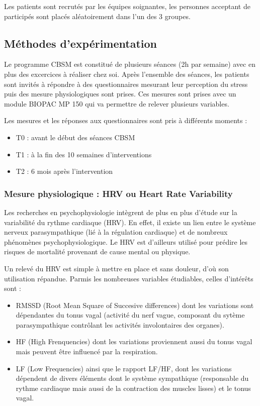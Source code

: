 \documentclass[]{article}
\providecommand{\tightlist}{%
  \setlength{\itemsep}{0pt}\setlength{\parskip}{0pt}}
\begin{document}
Les patients sont recrutés par les équipes soignantes, les personnes
acceptant de participés sont placés aléatoirement dans l'un des 3
groupes.

\hypertarget{muxe9thodes-dexpuxe9rimentation}{%
\subsection{Méthodes
d'expérimentation}\label{muxe9thodes-dexpuxe9rimentation}}

Le programme CBSM est constitué de plusieurs séances (2h par semaine)
avec en plus des excercices à réaliser chez soi. Après l'ensemble des
séances, les patients sont invités à répondre à des questionnaires
mesurant leur perception du stress puis des mesure physiologiques sont
prises. Ces mesures sont prises avec un module BIOPAC MP 150 qui va
permettre de relever plusieurs variables.

Les mesures et les réponses aux questionnaires sont pris à différents
moments :

\begin{itemize}
\tightlist
\item
  T0 : avant le début des séances CBSM
\item
  T1 : à la fin des 10 semaines d'interventions
\item
  T2 : 6 mois après l'intervention
\end{itemize}

\hypertarget{mesure-physiologique-hrv-ou-heart-rate-variability}{%
\subsubsection{Mesure physiologique : HRV ou Heart Rate
Variability}\label{mesure-physiologique-hrv-ou-heart-rate-variability}}

Les recherches en psychophysiologie intègrent de plus en plus d'étude
sur la variabilité du rythme cardiaque (HRV). En effet, il existe un
lien entre le système nerveux parasympathique (lié à la régulation
cardiaque) et de nombreux phénomènes psychophysiologique. Le HRV est
d'ailleurs utilisé pour prédire les risques de mortalité provenant de
cause mental ou physique.

Un relevé du HRV est simple à mettre en place et sans douleur, d'où son
utilisation répandue. Parmis les nombreuses variables étudiables, celles
d'intérêts sont :

\begin{itemize}
\tightlist
\item
  RMSSD (Root Mean Square of Succesive differences) dont les variations
  sont dépendantes du tonus vagal (activité du nerf vague, composant du
  sytème parasympathique contrôlant les activités involontaires des
  organes).
\item
  HF (High Frenquencies) dont les variations proviennent aussi du tonus
  vagal mais peuvent être influencé par la respiration.
\item
  LF (Low Frequencies) ainsi que le rapport LF/HF, dont les variations
  dépendent de divers éléments dont le système sympathique (responsable
  du rythme cardiaque mais aussi de la contraction des muscles lisses)
  et le tonus vagal.
\end{itemize}
\end{document}
